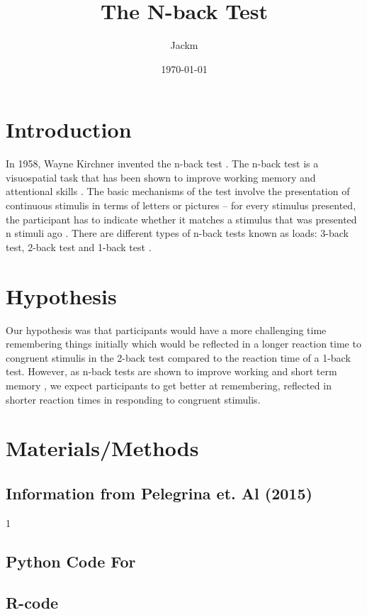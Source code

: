 \documentclass{article}
\author{Jackm}
\date{\today}
\title{The N-back Test}
\begin{document}
\maketitle
\tableofcontents


\section{Introduction}
\label{sec:orge65c12a}

In 1958, Wayne Kirchner invented the n-back test \cite{COULACOGLOU201791}. The n-back test is a visuospatial task that has been shown to improve working memory and attentional skills \cite{COLOM2013712}. The basic mechanisms of the test involve the presentation of continuous stimulis in terms of letters or pictures – for every stimulus presented, the participant has to indicate whether it matches a stimulus that was presented n stimuli ago \cite{Kane}. There are different types of n-back tests known as loads: 3-back test, 2-back test and 1-back test \cite{Forns}.

\section{Hypothesis}
\label{sec:org62e39d4}

Our hypothesis was that participants would have a more challenging time remembering things initially which would be reflected in a longer reaction time to congruent stimulis in the 2-back test compared to the reaction time of a 1-back test. However, as n-back tests are shown to improve working and short term memory \cite{LEONDOMINGUEZ2015167}, we expect participants to get better at remembering, reflected in shorter reaction times in responding to congruent stimulis.

\section{Materials/Methods}
\label{sec:orgfdc026e}
\subsection{Information from Pelegrina et. Al (2015)}
\label{sec:orgc0b51fb}
\cite{NormativeData}
1

\subsection{Python Code For}
\label{sec:org1f4abf8}
\subsection{R-code}
\label{sec:org8fce3a7}
\end{document}
